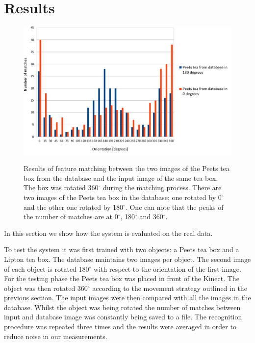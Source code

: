 \section{Results}

\begin{figure}

\includegraphics[width=1.3\columnwidth]{figures/print2.pdf}\\


\caption[Results of feature matching between the two images of the Peets tea box from the database and the input image of the same tea box.]{Results of feature matching between the two images of the Peets tea box from the database and the input image of the same tea box. The box was rotated 360$^\circ$ during the matching process. There are two images of the Peets tea box in the database; one rotated by 0$^\circ$ and the other one rotated by 180$^\circ$. One can note that the peaks of the number of matches are at 0$^\circ$, 180$^\circ$ and 360$^\circ$.}
\label{fig:recognition-results}
\end{figure}
In this section we show how the system is evaluated on the real data. 

To test the system it was first trained with two objects: a Peets tea box and a Lipton tea box. The database maintains two images per object. The second image of each object is rotated 180$^\circ$ with respect to the orientation of the first image. For the testing phase the Peets tea box was placed in front of the Kinect. The object was then rotated 360$^\circ$ according to the movement strategy outlined in the previous section. The input images were then compared with all the images in the database. Whilst the object was being rotated the number of matches between input and database image was constantly being saved to a file. The recognition procedure was repeated three times and the results were averaged in order to reduce noise in our measurements.

